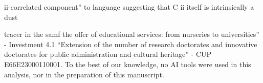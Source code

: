 \documentclass{aa}
\begin{document}
\begin{acknowledgements}
ii-correlated component” to language suggesting that C ii itself is intrinsically a dust

tracer in the samf the offer of educational services: from nurseries to
  universities” - Investment 4.1 “Extension of the number of research
  doctorates and innovative doctorates for public administration and
  cultural heritage” - CUP E66E23000110001.
  To the best of our knowledge, no AI tools were used in this analysis, nor in the preparation of this manuscript.
\end{acknowledgements}





\end{document}
